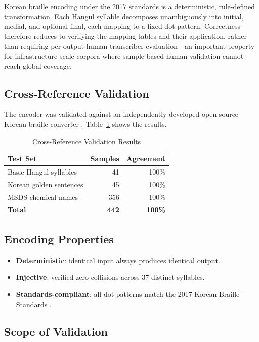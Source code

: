 \documentclass[journal]{IEEEtran}
\begin{document}
Korean braille encoding under the 2017 standards is a deterministic, rule-defined transformation. Each Hangul syllable decomposes unambiguously into initial, medial, and optional final, each mapping to a fixed dot pattern. Correctness therefore reduces to verifying the mapping tables and their application, rather than requiring per-output human-transcriber evaluation---an important property for infrastructure-scale corpora where sample-based human validation cannot reach global coverage.

\subsection{Cross-Reference Validation}

The encoder was validated against an independently developed open-source Korean braille converter \cite{hangul_braille_converter}. Table~\ref{tab:validation} shows the results.

\begin{table}[h]
\centering
\caption{Cross-Reference Validation Results}
\label{tab:validation}
\begin{tabular}{lrr}
\toprule
Test Set & Samples & Agreement \\
\midrule
Basic Hangul syllables & 41 & 100\% \\
Korean golden sentences & 45 & 100\% \\
MSDS chemical names & 356 & 100\% \\
\midrule
\textbf{Total} & \textbf{442} & \textbf{100\%} \\
\bottomrule
\end{tabular}
\end{table}

\subsection{Encoding Properties}

\begin{itemize}
\item \textbf{Deterministic}: identical input always produces identical output.
\item \textbf{Injective}: verified zero collisions across 37 distinct syllables.
\item \textbf{Standards-compliant}: all dot patterns match the 2017 Korean Braille Standards \cite{ko_braille_2017}.
\end{itemize}

\subsection{Scope of Validation}
\end{document}
